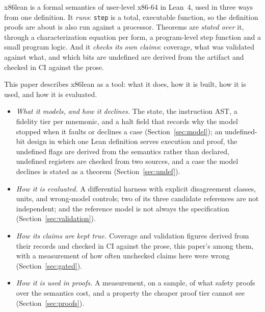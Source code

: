 \documentclass[runningheads]{llncs}
\newcommand{\src}[1]{}  %
\newcommand{\lean}[1]{\texttt{#1}}
\begin{document}
x86lean is a formal semantics of user-level x86-64 in Lean~4, used in three ways from one definition. It
\emph{runs}: \lean{step} is a total, executable function, so the definition proofs are about is also run against
a processor. Theorems are \emph{stated over} it, through a characterization equation per form, a program-level step function and a small program logic. And it \emph{checks its own claims}: coverage, what was validated
against what, and which bits are undefined are derived from the artifact and checked in CI against the prose.

This paper describes x86lean as a tool: what it does, how it is built, how it is used, and how it is
evaluated.
\begin{itemize}
\item \emph{What it models, and how it declines.} The state, the instruction AST, a fidelity tier per
  mnemonic, and a halt field that records why the model stopped when it faults or declines a case
  (Section~\ref{sec:model}); an undefined-bit design in which one Lean definition serves execution and proof, the
  undefined flags are derived from the semantics rather than declared, undefined registers are checked from two
  sources, and a case the model declines is stated as a theorem (Section~\ref{sec:undef}).
  \src{X86/Theorems.lean step\_dshift\_mem\_undefined\_refuses}
\item \emph{How it is evaluated.} A differential harness with explicit disagreement classes, units, and wrong-model
  controls; two of its three candidate references are not independent; and the reference model is not always the
  specification (Section~\ref{sec:validation}).
\item \emph{How its claims are kept true.} Coverage and validation figures derived from their records and checked in CI
  against the prose, this paper's among them, with a measurement of how often unchecked claims here were wrong
  (Section~\ref{sec:gated}).
\item \emph{How it is used in proofs.} A measurement, on a sample, of what safety proofs over the semantics cost, and a
  property the cheaper proof tier cannot see (Section~\ref{sec:proofs}).
  \src{X86/Program.lean runP\_safe; Tests/Program.lean countdown\_writes\_no\_memory, fill\_safe, memcpy\_safe,
  scan\_writes\_no\_memory, prologue\_preserves\_caller\_frame, guarded\_writes\_only\_in\_buffer; the property the
  cheaper tier cannot see is not proved: the section Proofs Over the Semantics, ``What the cheaper tier cannot see''}
\end{itemize}
\end{document}
